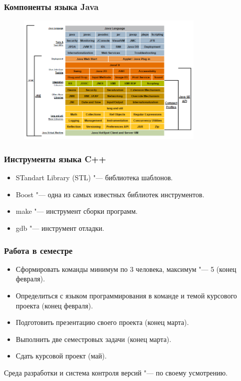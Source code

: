 \documentclass[default]{beamer}
\begin{document}
	\begin{frame}
	\frametitle{Компоненты языка Java}
	
	\begin{figure}
	\includegraphics[width=0.8\textwidth]{java_stack}
	\end{figure}
	\end{frame}	
	
	\begin{frame}
	\frametitle{Инструменты языка C++}
	
	\begin{itemize}
	\item STandart Library (STL) "--- библиотека шаблонов.
	\item Boost "--- одна из самых известных библиотек инструментов.
	\item make "--- инструмент сборки программ.
	\item gdb "--- инструмент отладки.
	\end{itemize}
	\end{frame}	
	
	\begin{frame}
	\frametitle{Работа в семестре}
	
	\begin{itemize}
	\item Сформировать команды минимум по 3 человека, максимум "--- 5 (конец
	февраля).
	\item Определиться с языком программирования в команде и темой курсового
	проекта (конец февраля).
	\item Подготовить презентацию своего проекта (конец марта).
	\item Выполнить две семестровых задачи (конец марта).
	\item Сдать курсовой проект (май).
	\end{itemize}
	\par\bigskip
	Среда разработки и система контроля версий "--- по своему усмотрению.
	\end{frame}
	
\end{document}
